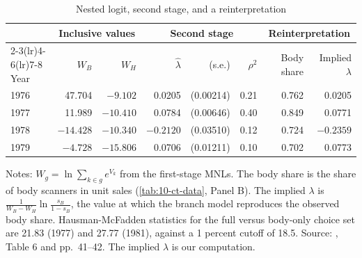 \begin{table}[htbp]
\centering
\caption{Nested logit, second stage, and a reinterpretation}
\label{tab:10-ct-nested}
\small
\begin{tabular}{@{}lrrrrrrr@{}}
\toprule
& \multicolumn{2}{c}{Inclusive values} & \multicolumn{3}{c}{Second stage} & \multicolumn{2}{c}{Reinterpretation} \\
\cmidrule(lr){2-3}\cmidrule(lr){4-6}\cmidrule(lr){7-8}
Year & $W_B$ & $W_H$ & $\hat\lambda$ & (s.e.) & $\rho^2$ & Body share & Implied $\lambda$ \\
\midrule
1976 & 47.704 & $-9.102$ & 0.0205 & (0.00214) & 0.21 & 0.762 & 0.0205 \\
1977 & 11.989 & $-10.410$ & 0.0784 & (0.00646) & 0.40 & 0.849 & 0.0771 \\
1978 & $-14.428$ & $-10.340$ & $-0.2120$ & (0.03510) & 0.12 & 0.724 & $-0.2359$ \\
1979 & $-4.728$ & $-15.806$ & 0.0706 & (0.01211) & 0.10 & 0.702 & 0.0773 \\
\bottomrule
\end{tabular}

\smallskip
\begin{minipage}{0.94\linewidth}
\footnotesize Notes: $W_g = \ln\sum_{k\in g}e^{V_k}$ from the first-stage MNLs. The body share is the share of body
scanners in unit sales (\cref{tab:10-ct-data}, Panel B). The implied $\lambda$ is $\frac{1}{W_B - W_H}\ln\frac{s_B}{1
- s_B}$, the value at which the branch model reproduces the observed body share. Hausman-McFadden statistics for the
full versus body-only choice set are 21.83 (1977) and 27.77 (1981), against a 1 percent cutoff of 18.5. Source:
\citet{Trajtenberg1985}, Table 6 and pp.~41--42. The implied $\lambda$ is our computation.
\end{minipage}
\end{table}

